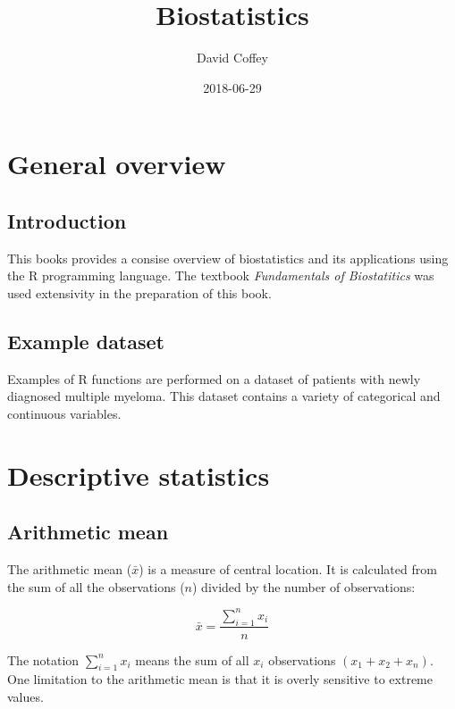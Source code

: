 \documentclass[]{book}
\title{Biostatistics}
\author{David Coffey}
\date{2018-06-29}
\newenvironment{Shaded}{\begin{snugshade}}{\end{snugshade}}
\newcommand{\KeywordTok}[1]{\textcolor[rgb]{0.13,0.29,0.53}{\textbf{#1}}}
\newcommand{\StringTok}[1]{\textcolor[rgb]{0.31,0.60,0.02}{#1}}
\newcommand{\CommentTok}[1]{\textcolor[rgb]{0.56,0.35,0.01}{\textit{#1}}}
\newcommand{\OperatorTok}[1]{\textcolor[rgb]{0.81,0.36,0.00}{\textbf{#1}}}
\newcommand{\NormalTok}[1]{#1}
\theoremstyle{definition}
\theoremstyle{definition}
\theoremstyle{definition}
\theoremstyle{remark}
\begin{document}
\maketitle

{
\setcounter{tocdepth}{1}
\tableofcontents
}
\chapter{General overview}\label{general-overview}

\section{Introduction}\label{introduction}

This books provides a consise overview of biostatistics and its
applications using the R programming language. The textbook
\emph{Fundamentals of Biostatitics} \citep{Rosner2016} was used
extensivity in the preparation of this book.

\section{Example dataset}\label{example-dataset}

Examples of R functions are performed on a dataset of patients with
newly diagnosed multiple myeloma. This dataset contains a variety of
categorical and continuous variables.

\chapter{Descriptive statistics}\label{descriptive-statistics}

\section{Arithmetic mean}\label{arithmetic-mean}

The arithmetic mean (\(\bar{x}\)) is a measure of central location. It
is calculated from the sum of all the observations (\({n}\)) divided by
the number of observations:

\[\bar{x}=\frac{\sum_{i=1}^nx_{i}}{n}\]

The notation \(\sum_{i=1}^nx_{i}\) means the sum of all \({x}_i\)
observations \(({x}_1+{x}_2+{x}_n)\). One limitation to the arithmetic
mean is that it is overly sensitive to extreme values.

\begin{Shaded}
\end{Shaded}
\end{document}
